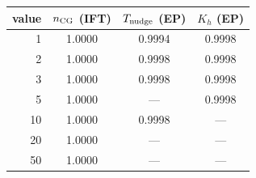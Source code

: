 \begin{tabular}{r ccc}
\toprule
value & $n_{\rm CG}$ (IFT) & $T_{\rm nudge}$ (EP) & $K_h$ (EP) \\ \midrule
1 & 1.0000 & 0.9994 & 0.9998 \\
2 & 1.0000 & 0.9998 & 0.9998 \\
3 & 1.0000 & 0.9998 & 0.9998 \\
5 & 1.0000 & --- & 0.9998 \\
10 & 1.0000 & 0.9998 & --- \\
20 & 1.0000 & --- & --- \\
50 & 1.0000 & --- & --- \\
\bottomrule
\end{tabular}
